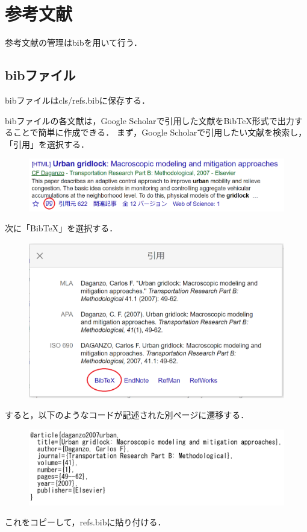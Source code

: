 \documentclass[../main/main]{subfiles}
\begin{document}
\newpage
\section{参考文献}
参考文献の管理はbibを用いて行う．
\subsection{bibファイル}
bibファイルはcls/refs.bibに保存する．
\par
bibファイルの各文献は，Google Scholarで引用した文献をBibTeX形式で出力することで簡単に作成できる．
まず，Google Scholarで引用したい文献を検索し，「引用」を選択する．
\begin{figure}[!ht]
  \centering
  \includegraphics[clip, width=0.5\columnwidth]{image/bib1.png}
  \label{fig:bib1}
\end{figure}
\par
次に「BibTeX」を選択する．
\begin{figure}[!ht]
  \centering
  \includegraphics[clip, width=0.5\columnwidth]{image/bib2.png}
  \label{fig:bib1}
\end{figure}
\par
すると，以下のようなコードが記述された別ページに遷移する．
\begin{figure}[!ht]
  \centering
  \includegraphics[clip, width=0.5\columnwidth]{image/bib3.png}
  \label{fig:bib1}
\end{figure}
\par
これをコピーして，refs.bibに貼り付ける．
\end{document}
